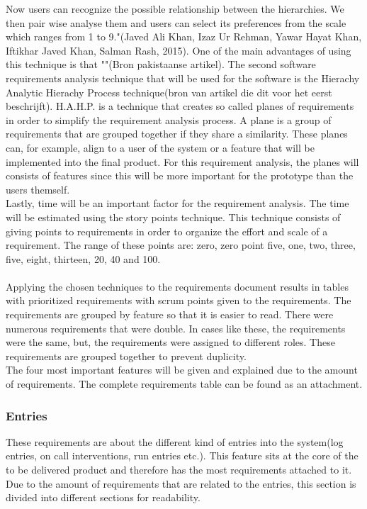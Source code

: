 \documentclass[paper=a4, fontsize=11pt,twoside]{scrartcl}	%
\begin{document}
Now users can recognize the possible relationship between 
the hierarchies. We then pair wise analyse them and users can select its preferences from the scale which ranges from 
1 to 9."(Javed Ali Khan, Izaz Ur Rehman, Yawar Hayat Khan, Iftikhar Javed Khan, Salman Rash, 2015). One of the main advantages of using this technique is that ""(Bron pakistaanse artikel). The second software requirements analysis technique that will be used for the software is the Hierachy Analytic Hierachy Process technique(bron van artikel die dit voor het eerst beschrijft). H.A.H.P. is a technique that creates so called planes of requirements in order to simplify the requirement analysis process. A plane is a group of requirements that are grouped together if they share a similarity. These planes can, for example, align to a user of the system or a feature that will be implemented into the final product. For this requirement analysis, the planes will consists of features since this will be more important for the prototype than the users themself. \\
Lastly, time will be an important factor for the requirement analysis. The time will be estimated using the story points technique. This technique consists of giving  points to requirements in order to organize the effort and scale of a requirement. The range of these points are:  zero, zero point five, one, two, three, five, eight, thirteen, 20, 40 and 100. \\ \\
Applying the chosen techniques to the requirements document results in tables with prioritized requirements with scrum points given to the requirements. The requirements are grouped by feature so that it is easier to read. There were numerous requirements that were double. In cases like these, the requirements were the same, but, the requirements were assigned to different roles. These requirements are grouped together to prevent duplicity. \\
The four most important features will be given and explained due to the amount of requirements. The complete requirements table can be found as an attachment.\\

\subsubsection{Entries}
These requirements are about the different kind of entries into the system(log entries, on call interventions, run entries etc.). This feature sits at the core of the to be delivered product and therefore has the most requirements attached to it. Due to the amount of requirements that are related to the entries, this section is divided into different sections for readability. 
\end{document}
